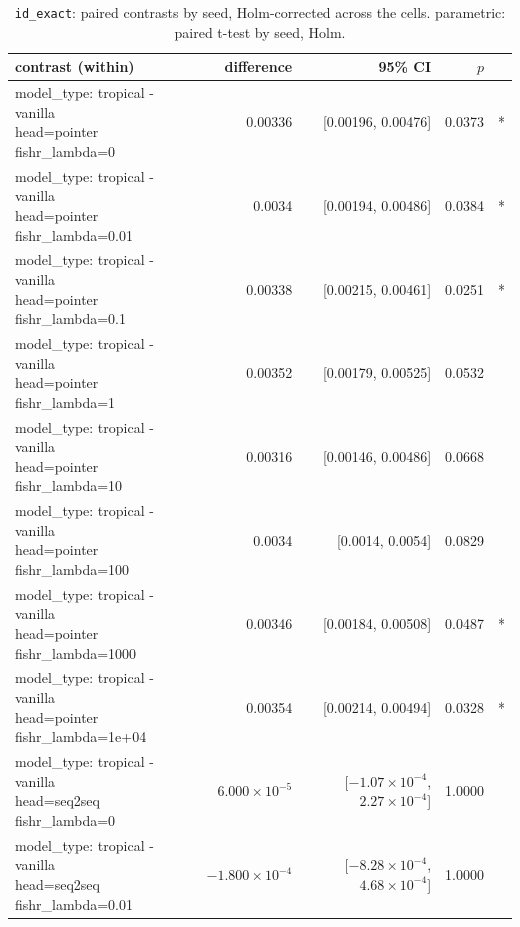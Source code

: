 \documentclass[10pt]{article}
\makeatletter
\newcommand{\stackcell}[1]{\begin{tabular}[t]{@{}l@{}}#1\end{tabular}}
\makeatother
\begin{document}
{\small
\begin{longtable}{lrrrl}
\caption{\texttt{id\_exact}: paired contrasts by seed, Holm-corrected across the cells. parametric: paired t-test by seed, Holm.}\label{tab:paired-id_exact}\\
\toprule
contrast (within) & difference & 95\% CI & $p$ & \\
\midrule
\endhead
\stackcell{model\_type: tropical - vanilla\\\footnotesize head=pointer fishr\_lambda=0 } & 0.00336 & [0.00196, 0.00476] & 0.0373 & *\\
\stackcell{model\_type: tropical - vanilla\\\footnotesize head=pointer fishr\_lambda=0.01 } & 0.0034 & [0.00194, 0.00486] & 0.0384 & *\\
\stackcell{model\_type: tropical - vanilla\\\footnotesize head=pointer fishr\_lambda=0.1 } & 0.00338 & [0.00215, 0.00461] & 0.0251 & *\\
\stackcell{model\_type: tropical - vanilla\\\footnotesize head=pointer fishr\_lambda=1 } & 0.00352 & [0.00179, 0.00525] & 0.0532 & \\
\stackcell{model\_type: tropical - vanilla\\\footnotesize head=pointer fishr\_lambda=10 } & 0.00316 & [0.00146, 0.00486] & 0.0668 & \\
\stackcell{model\_type: tropical - vanilla\\\footnotesize head=pointer fishr\_lambda=100 } & 0.0034 & [0.0014, 0.0054] & 0.0829 & \\
\stackcell{model\_type: tropical - vanilla\\\footnotesize head=pointer fishr\_lambda=1000 } & 0.00346 & [0.00184, 0.00508] & 0.0487 & *\\
\stackcell{model\_type: tropical - vanilla\\\footnotesize head=pointer fishr\_lambda=1e+04 } & 0.00354 & [0.00214, 0.00494] & 0.0328 & *\\
\stackcell{model\_type: tropical - vanilla\\\footnotesize head=seq2seq fishr\_lambda=0 } & $6.000\times10^{-5}$ & [$-1.07\times10^{-4}$, $2.27\times10^{-4}$] & 1.0000 & \\
\stackcell{model\_type: tropical - vanilla\\\footnotesize head=seq2seq fishr\_lambda=0.01 } & $-1.800\times10^{-4}$ & [$-8.28\times10^{-4}$, $4.68\times10^{-4}$] & 1.0000 & \\

\end{longtable}}
\end{document}
